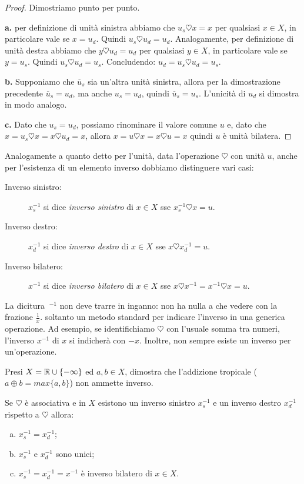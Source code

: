 		\begin{proof}
			Dimostriamo punto per punto.
			
			\textbf{a.} per definizione di unità sinistra abbiamo che $u_s\heartsuit x=x$ per qualsiasi $x\in X$, in particolare vale se $x=u_d$. Quindi $u_s\heartsuit u_d=u_d$. Analogamente, per definizione di unità destra abbiamo che $y\heartsuit u_d=u_d$ per qualsiasi $y\in X$, in particolare vale se $y=u_s$. Quindi $u_s\heartsuit u_d=u_s$. Concludendo: $u_d=u_s\heartsuit u_d=u_s$.
			
			\textbf{b.} Supponiamo che $\overline{u}_s$ sia un'altra unità sinistra, allora per la dimostrazione precedente $\overline{u}_s=u_d$, ma anche $u_s=u_d$, quindi $\overline{u}_s=u_s$. L'unicità di $u_d$ si dimostra in modo analogo.
			
			\textbf{c.} Dato che $u_s=u_d$, possiamo rinominare il valore comune $u$ e, dato che $x=u_s\heartsuit x = x\heartsuit u_d = x$, allora $x=u\heartsuit x = x\heartsuit u = x$ quindi $u$ è unità bilatera.
		\end{proof}
		Analogamente a quanto detto per l'unità, data l'operazione $\heartsuit$ con unità $u$, anche per l'esistenza di un elemento inverso dobbiamo distinguere vari casi:
		\begin{description}
			\item[Inverso sinistro:] $x_s^{-1}$ si dice \emph{inverso sinistro} di $x\in X$ sse $x_s^{-1}\heartsuit x=u$.
			\item[Inverso destro:] $x_d^{-1}$ si dice \emph{inverso destro} di $x\in X$ sse $x\heartsuit x_d^{-1}=u$.
			\item[Inverso bilatero:] $x^{-1}$ si dice \emph{inverso bilatero} di $x\in X$ sse $x\heartsuit x^{-1}=x^{-1}\heartsuit x=u$.
		\end{description}
		La dicitura $\ ^{-1}$ non deve trarre in inganno: non ha nulla a che vedere con la frazione $\frac{1}{x}$. \Egrave soltanto un metodo standard per indicare l'inverso in una generica operazione. Ad esempio, se identifichiamo $\heartsuit$ con l'usuale somma tra numeri, l'inverso $x^{-1}$ di $x$ si indicherà con $-x$. Inoltre, non sempre esiste un inverso per un'operazione.
		\begin{es} 
			Presi $X=\mathbb{R}\cup\{-\infty\}$ ed $a,b\in X$, dimostra che l'addizione tropicale ($a\oplus b=max\{a,b\}$) non ammette inverso.
		\end{es}
		\begin{prop}
			Se $\heartsuit$ è associativa e in $X$ esistono un inverso sinistro $x_s^{-1}$ e un inverso destro $x_d^{-1}$ rispetto a $\heartsuit$ allora:
			\begin{enumerate}[a.]
				\item $x_s^{-1}=x_d^{-1}$;
				\item $x_s^{-1}$ e $x_d^{-1}$ sono unici;
				\item $x_s^{-1}=x_d^{-1}=x^{-1}$ è inverso bilatero di $x\in X$.
			\end{enumerate}
		\end{prop}
